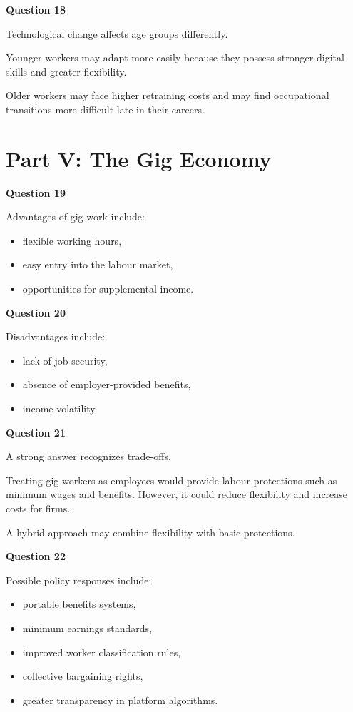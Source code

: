 \documentclass[12pt]{article}
\begin{document}
\textbf{Question 18}

Technological change affects age groups differently.

Younger workers may adapt more easily because they possess stronger digital skills and greater flexibility.

Older workers may face higher retraining costs and may find occupational transitions more difficult late in their careers.

\section*{Part V: The Gig Economy}

\textbf{Question 19}

Advantages of gig work include:

\begin{itemize}
\item flexible working hours,
\item easy entry into the labour market,
\item opportunities for supplemental income.
\end{itemize}

\textbf{Question 20}

Disadvantages include:

\begin{itemize}
\item lack of job security,
\item absence of employer-provided benefits,
\item income volatility.
\end{itemize}

\textbf{Question 21}

A strong answer recognizes trade-offs.

Treating gig workers as employees would provide labour protections such as minimum wages and benefits. However, it could reduce flexibility and increase costs for firms.

A hybrid approach may combine flexibility with basic protections.

\textbf{Question 22}

Possible policy responses include:

\begin{itemize}
\item portable benefits systems,
\item minimum earnings standards,
\item improved worker classification rules,
\item collective bargaining rights,
\item greater transparency in platform algorithms.
\end{itemize}
\end{document}
